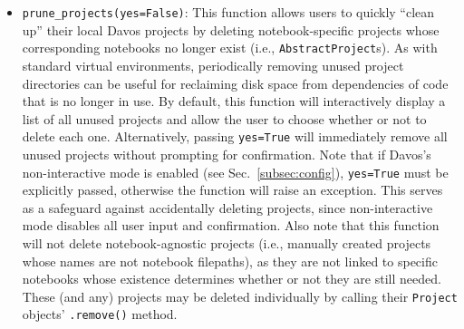 \documentclass[preprint,12pt,a4paper]{elsarticle}
\begin{document}
\begin{itemize}
\item \texttt{prune\_projects(yes=False)}: This function allows users to quickly ``clean up'' their local Davos projects by deleting notebook-specific projects whose corresponding notebooks no longer exist (i.e., \texttt{AbstractProject}s).
  As with standard virtual environments, periodically removing unused project directories can be useful for reclaiming disk space from dependencies of code that is no longer in use.
  By default, this function will interactively display a list of all unused projects and allow the user to choose whether or not to delete each one.
  Alternatively, passing \texttt{yes=True} will immediately remove all unused projects without prompting for confirmation.
  Note that if Davos's non-interactive mode is enabled (see Sec.~\ref{subsec:config}), \texttt{yes=True} must be explicitly passed, otherwise the function will raise an exception.
  This serves as a safeguard against accidentally deleting projects, since non-interactive mode disables all user input and confirmation.
  Also note that this function will not delete notebook-agnostic projects (i.e., manually created projects whose names are not notebook filepaths), as they are not linked to specific notebooks whose existence determines whether or not they are still needed.
  These (and any) projects may be deleted individually by calling their \texttt{Project} objects' \texttt{.remove()} method.


\end{itemize}
\end{document}
